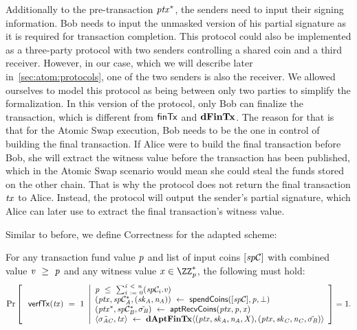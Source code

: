 \begin{definition}
\begin{itemize}
        Additionally to the pre-transaction $\mathit{ptx}^*$, the senders need to input their signing information.
        Bob needs to input the unmasked version of his partial signature as it is required for transaction completion.
        This protocol could also be implemented as a three-party protocol with two senders controlling a shared coin and a third receiver.
        However, in our case, which we will describe later in~\cref{sec:atom:protocols}, one of the two senders is also the receiver.
        We allowed ourselves to model this protocol as being between only two parties to simplify the formalization.
        In this version of the protocol, only Bob can finalize the transaction, which is different from $\mathsf{finTx}$ and $\mathbf{dFinTx}$.
        The reason for that is that for the Atomic Swap execution, Bob needs to be the one in control of building the final transaction.
        If Alice were to build the final transaction before Bob, she will extract the witness value before the transaction has been published, which in the Atomic Swap scenario would mean she could steal the funds stored on the other chain.
        That is why the protocol does not return the final transaction $\mathit{tx}$ to Alice.
        Instead, the protocol will output the sender's partial signature, which Alice can later use to extract the final transaction's witness value.
    \end{itemize}
\end{definition}

Similar to before, we define Correctness for the adapted scheme:

\begin{definition}
    \label{def:atom:apt-tx-scheme-correctness}
    For any transaction fund value $\mathit{p}$ and list of input coins $[\mathit{sp}\mathcal{C}]$ with combined value $\mathit{v} ~\geq~ \mathit{p}$ and any witness value $\varX \opIn \cnstIntegersPrimeWithoutZero{\varPrime}$, the following must hold:
    \[
        \Pr\left[
        \begin{array}{c}
            \: \mathsf{verfTx}(\mathit{tx}) ~=~ 1
        \end{array}
        \middle\vert
        \begin{array}{l}
            \mathit{p} ~\leq~ \sum_{\mathit{i} ~:=~ 0}^{\mathit{i} ~<~ \mathit{n}}(\mathit{sp}\mathcal{C}_{i}.\mathit{v}) \\
            (\mathit{ptx}, \mathit{sp}\mathcal{C}_{\mathit{A}}^*, (\mathit{sk}_{\mathit{A}}, \mathit{\mathit{n}_{\mathit{A}}})) ~\leftarrow~ \mathsf{spendCoins}([\mathit{sp}\mathcal{C}],\mathit{p},\bot) \\
            (\mathit{ptx}^*, \mathit{sp}\mathcal{C}_{\mathit{B}}^*, \tilde{\sigma_{\mathit{B}}}) ~\leftarrow~ \mathsf{aptRecvCoins}(\mathit{ptx},\mathit{p},\mathit{x}) \\
            \langle \tilde{\sigma_{\mathit{A}\mathit{C}}}, \mathit{tx} \rangle ~\leftarrow~ \mathbf{dAptFinTx} \langle (\mathit{ptx},\mathit{sk}_{\mathit{A}},\mathit{\mathit{n}_{\mathit{A}}},\mathit{X}), (\mathit{ptx},\mathit{sk}_{\mathit{C}},\mathit{\mathit{n}_{\mathit{C}}},\tilde{\sigma_{\mathit{B}}}) \rangle
        \end{array}
        \right]=1.
    \]
\end{definition}
